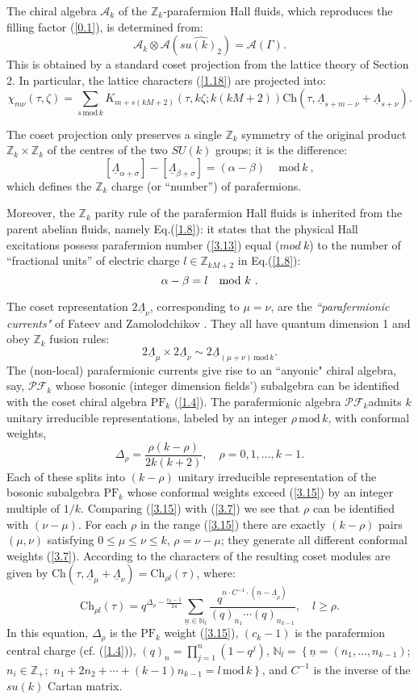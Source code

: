 \documentclass[a4paper,12pt]{article}
\newcommand{\beq}{\begin{equation}}
\newcommand{\eeq}{\end{equation}}
\def \L {\underline{\Lambda}}
\def \s {\sigma}
\def \r {\rho}
\def \z {\zeta}
\def \A {{\mathcal A} }
\def \D {\Delta}
\def \Z {{\mathbb Z}}
\def \N {{\mathbb N}}
\def \G   {\Gamma}
\def \mod {\, \mathrm{mod}\, }
\def \PF {\mathrm{PF}}
\def \ch {\mathrm{Ch} }
\def \PFC {${\mathcal{P}\mathcal{F}_k}$}
\begin{document}
The chiral algebra $\A_k$ of the $\Z_k$-parafermion Hall fluids, 
which reproduces the filling factor (\ref{0.1}), is determined from:
\beq\label{3.11}
\A_k \otimes \A(\widehat{su(k)_2})=\A(\G).
\eeq
This is obtained by a standard coset projection from the lattice
theory of Section 2. In particular, the lattice
characters (\ref{1.18}) are projected into:
\beq\label{3.12}
   \chi_{m \nu } (\tau, \z) = \sum_{s \mod  k} K_{m+ s(kM+2)}
(\tau , k\z; k(kM+2)) \ch(\tau, \L_{s+m-\nu} +\L_{s+\nu} ) .
\eeq

The coset projection only preserves a single $\Z_k$ symmetry of 
the original product $\Z_k \times \Z_k$ of the
centres of the two $SU(k)$ groups; it is the difference:
\beq\label{3.13}
[\L_{\alpha +\s}]- [\L_{\beta +\s}]= (\alpha - \beta) \quad \mod k \ , 
\eeq
which defines the $\Z_k$ charge (or ``number'') of parafermions.

Moreover, the $\Z_k$ parity rule of the parafermion Hall fluids
is inherited from the parent abelian fluids, namely Eq.(\ref{1.8}): 
it states that the physical Hall excitations possess
parafermion number (\ref{3.13}) 
equal ($mod \ k$) to the number of ``fractional units'' of electric charge 
$l \in \Z_{kM+2}$ in Eq.(\ref{1.8}):
\beq\label{p-rule}
\alpha -\beta =l \quad {\rm mod}\ k\ .
\eeq

The coset representation $2\L_\nu$, corresponding to $\mu=\nu$,
are the {\it ``parafermionic currents"} of Fateev and Zamolodchikov
\cite{zf}. They all have quantum dimension 1 and obey $\Z_k$ fusion rules:
\beq\label{3.14}
2\L_{\mu} \times 2\L_{\nu}  \sim   2\L_{(\mu+\nu) \mod k} .
\eeq
The (non-local) parafermionic currents give rise
to an ``anyonic" chiral algebra, say, \PFC
whose bosonic (integer dimension fields') subalgebra can be
 identified with the coset chiral algebra $\PF_k$ (\ref{1.4}). 
The parafermionic algebra \PFC admits $k$ unitary irreducible representations, 
labeled by an integer  $\r \mod  k$, with conformal weights,
\beq\label{3.15}
\D_\r = \frac{\r(k-\r)}{2k(k+2)}, \quad \r= 0,1,...,k-1.
\eeq
Each of these splits into $(k-\r)$ unitary irreducible representation 
of the bosonic subalgebra
$\PF_k$ whose conformal weights exceed (\ref{3.15}) by an integer multiple
of $1/k$.  Comparing (\ref{3.15}) with (\ref{3.7})
we see that $\r$ can be identified  with $(\nu-\mu)$. For each $\r$
in the range  (\ref{3.15}) there are  exactly $(k-\r)$ pairs $(\mu,\nu)$
satisfying $0\leq \mu\leq\nu\leq k$, $\r=\nu-\mu$; they generate all
different conformal weights (\ref{3.7}). According to \cite{schil} the
characters of the resulting coset modules are given by
$\ch(\tau,\L_\mu+\L_\nu)= \ch_{\r l}(\tau)$, where:
\beq\label{3.16}
\ch_{\r l}(\tau)=q^{\D_\r-\frac{c_k-1}{24}}
\sum\limits_{\underline{n}\in \N_l}
\frac{q^{\underline{n}\cdot C^{-1}\cdot (\underline{n}- \L_{\r} ) }}
{ (q)_{n_1}\cdots (q)_{n_{k-1}}},
\quad l\geq \r.
\eeq
In this equation, $\D_\r$ is the  $\PF_k$ weight (\ref{3.15}), $(c_k -1)$
is the parafermion central charge (cf. (\ref{1.4})),
$ (q)_n=\prod_{j=1}^n (1-q^j)$,
$\N_l=\left\{ \underline{n}=(n_1,\ldots,n_{k-1})\right.$; 
$n_i \in \Z_+ ;$
$ \left. n_1+2n_2+\cdots + (k-1)n_{k-1}=l \mod k\right\}$, and
$C^{-1}$ is the inverse of the $su(k)$ Cartan matrix.
\end{document}
